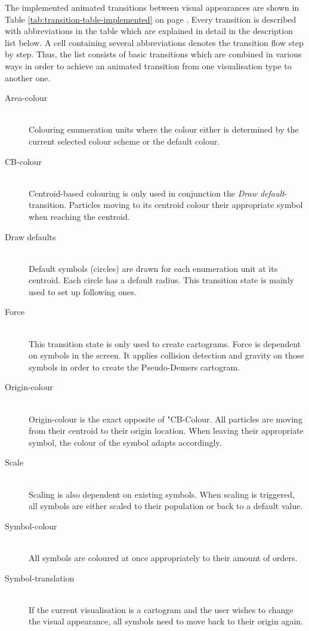 \label{s:animated-transitions-implemented}
The implemented animated transitions between visual appearances are shown in Table \ref{tab:transition-table-implemented} on page \pageref{tab:transition-table-implemented}. Every transition is described with abbreviations in the table which are explained in detail in the description list below. A cell containing several abbreviations denotes the transition flow step by step. Thus, the list consists of basic transitions which are combined in various ways in order to achieve an animated transition from one visualisation type to another one.

\begin{description}
\item[Area-colour] \hfill \\
Colouring enumeration units where the colour either is determined by the current selected colour scheme or the default colour.

\item[CB-colour] \hfill \\
Centroid-based colouring is only used in conjunction the \textit{Draw default}-transition. Particles moving to its centroid colour their appropriate symbol when reaching the centroid.

\item[Draw defaults] \hfill \\
Default symbols (circles) are drawn for each enumeration unit at its centroid. Each circle has a default radius. This transition state is mainly used to set up following ones.

\item[Force] \hfill \\
This transition state is only used to create cartograms. Force is dependent on symbols in the screen. It applies collision detection and gravity on those symbols in order to create the Pseudo-Demers cartogram.

\item[Origin-colour] \hfill \\
Origin-colour is the exact opposite of "CB-Colour. All particles are moving from their centroid to their origin location. When leaving their appropriate symbol, the colour of the symbol adapts accordingly.

\item[Scale] \hfill \\
Scaling is also dependent on existing symbols. When scaling is triggered, all symbols are either scaled to their population or back to a default value.

\item[Symbol-colour] \hfill \\
All symbols are coloured at once appropriately to their amount of orders.

\item[Symbol-translation] \hfill \\
If the current visualisation is a cartogram and the user wishes to change the visual appearance, all symbols need to move back to their origin again.

\end{description}

